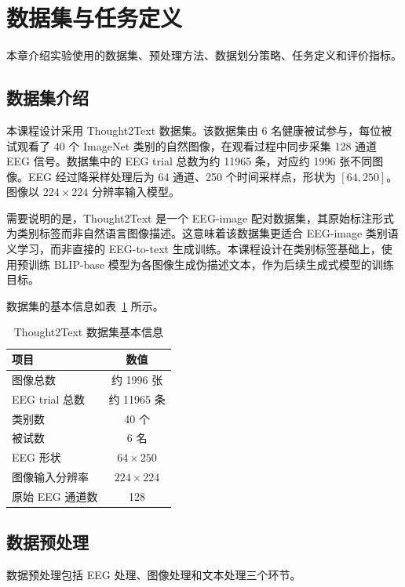 \section{数据集与任务定义}

本章介绍实验使用的数据集、预处理方法、数据划分策略、任务定义和评价指标。

\subsection{数据集介绍}

本课程设计采用 Thought2Text 数据集。该数据集由 6 名健康被试参与，每位被试观看了 40 个 ImageNet 类别的自然图像，在观看过程中同步采集 128 通道 EEG 信号。数据集中的 EEG trial 总数为约 11965 条，对应约 1996 张不同图像。EEG 经过降采样处理后为 64 通道、250 个时间采样点，形状为 $[64, 250]$。图像以 $224\times224$ 分辨率输入模型。

需要说明的是，Thought2Text 是一个 EEG-image 配对数据集，其原始标注形式为类别标签而非自然语言图像描述。这意味着该数据集更适合 EEG-image 类别语义学习，而非直接的 EEG-to-text 生成训练。本课程设计在类别标签基础上，使用预训练 BLIP-base 模型为各图像生成伪描述文本，作为后续生成式模型的训练目标。

数据集的基本信息如表~\ref{tab:dataset} 所示。

\begin{table}[htbp]
  \centering
  \caption{Thought2Text 数据集基本信息}
  \label{tab:dataset}
  \begin{tabular}{l c}
    \toprule
    项目 & 数值 \\
    \midrule
    图像总数 & 约 1996 张 \\
    EEG trial 总数 & 约 11965 条 \\
    类别数 & 40 个 \\
    被试数 & 6 名 \\
    EEG 形状 & $64\times250$ \\
    图像输入分辨率 & $224\times224$ \\
    原始 EEG 通道数 & 128 \\
    \bottomrule
  \end{tabular}
\end{table}

\subsection{数据预处理}

数据预处理包括 EEG 处理、图像处理和文本处理三个环节。

